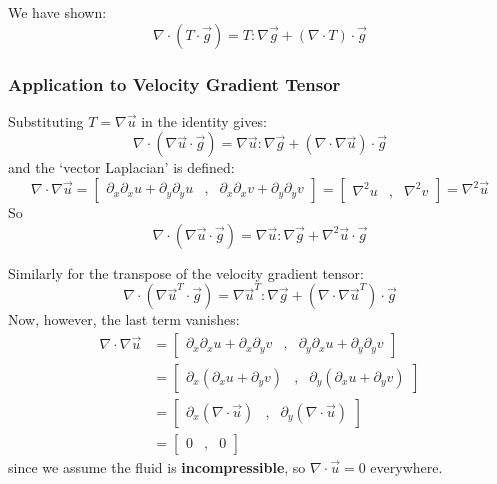 \documentclass[12pt, a4paper, twoside, openright]{book}
\begin{document}
We have shown:
\begin{equation*}
\nabla \cdot (T \cdot \vec{g}) =  T:\nabla \vec{g} + (\nabla \cdot T) \cdot \vec{g}
\end{equation*}


\subsubsection*{Application to Velocity Gradient Tensor}

Substituting $T = \nabla \vec{u}$ in the identity gives:
\begin{equation*}
\nabla \cdot (\nabla \vec{u} \cdot \vec{g}) = 
\nabla \vec{u}:\nabla \vec{g} + (\nabla \cdot \nabla \vec{u}) \cdot \vec{g}
\end{equation*}
and the `vector Laplacian' is defined:
\begin{equation*}
\nabla \cdot \nabla \vec{u} =
\begin{bmatrix}
\partial_x \partial_x u + \partial_y \partial_y u &,& \partial_x \partial_x v + \partial_y \partial_y v
\end{bmatrix} =
\begin{bmatrix}
\nabla^2 u &,& \nabla^2 v
\end{bmatrix}
= \nabla^2 \vec{u}
\end{equation*}
So
\begin{equation*}
\nabla \cdot (\nabla \vec{u} \cdot \vec{g}) = 
\nabla \vec{u}:\nabla \vec{g} + \nabla^2 \vec{u} \cdot \vec{g}
\end{equation*}

Similarly for the transpose of the velocity gradient tensor:
\begin{equation*}
\nabla \cdot (\nabla \vec{u}^T \cdot \vec{g}) = 
\nabla \vec{u}^T:\nabla \vec{g} + (\nabla \cdot \nabla \vec{u}^T) \cdot \vec{g}
\end{equation*}
Now, however, the last term vanishes:
\begin{align*}
\nabla \cdot \nabla \vec{u} & =
\begin{bmatrix}
\partial_x \partial_x u + \partial_x \partial_y v &,&
 \partial_y \partial_x u + \partial_y \partial_y v
\end{bmatrix} \\
 & =
\begin{bmatrix}
\partial_x ( \partial_x u + \partial_y v ) &,&
\partial_y ( \partial_x u + \partial_y v )
\end{bmatrix} \\
 & = 
\begin{bmatrix}
\partial_x ( \nabla \cdot \vec{u}) &,&
\partial_y ( \nabla \cdot \vec{u})
\end{bmatrix} \\
 & = 
 \begin{bmatrix}
 0 &,& 0
 \end{bmatrix}
\end{align*}
since we assume the fluid is \textbf{incompressible}, so $\nabla \cdot \vec{u} = 0$ everywhere.
\end{document}
